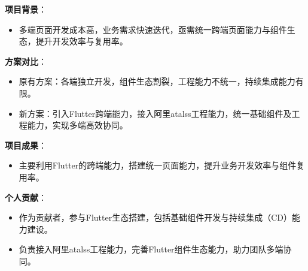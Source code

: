 \documentclass[]{deedy-resume-openfont}
\begin{document}




% 
% 

\newpage
\begin{minipage}[t]{0.2\textwidth} \end{minipage}
\hfill
\begin{minipage}[t]{0.75\textwidth} 

\vspace{0.1em}
\vspace{0.1em}
\begin{tightemize}
    \item \textbf{项目背景}：
        \begin{itemize}
            \item 多端页面开发成本高，业务需求快速迭代，亟需统一跨端页面能力与组件生态，提升开发效率与复用率。
        \end{itemize}
    \item \textbf{方案对比}：
        \begin{itemize}
            \item 原有方案：各端独立开发，组件生态割裂，工程能力不统一，持续集成能力有限。
            \item 新方案：引入Flutter跨端能力，接入阿里atalss工程能力，统一基础组件及工程能力，实现多端高效协同。
        \end{itemize}
    \item \textbf{项目成果}：
        \begin{itemize}
            \item 主要利用Flutter的跨端能力，搭建统一页面能力，提升业务开发效率与组件复用率。
        \end{itemize}
    \item \textbf{个人贡献}：
        \begin{itemize}
            \item 作为贡献者，参与Flutter生态搭建，包括基础组件开发与持续集成（CD）能力建设。
            \item 负责接入阿里atalss工程能力，完善Flutter组件生态能力，助力团队多端协同。
        \end{itemize}
\end{tightemize}
\sectionsep


\end{minipage}
\end{document}
